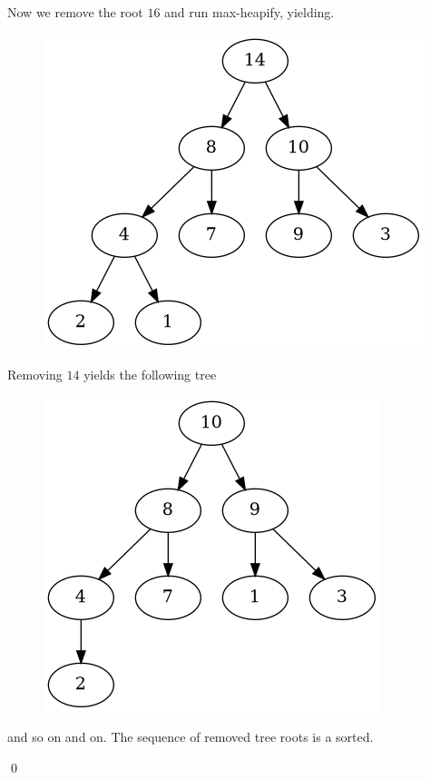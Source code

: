 Now we remove the root $16$ and run max-heapify, yielding.

\begin{figure}[H]
\centering
\includegraphics[scale=0.5]{images/heapsort_21.png}
\end{figure}

Removing $14$ yields the following tree

\begin{figure}[H]
\centering
\includegraphics[scale=0.5]{images/heapsort_22.png}
\end{figure}

and so on and on. The sequence of removed tree roots is a sorted.



\qed


